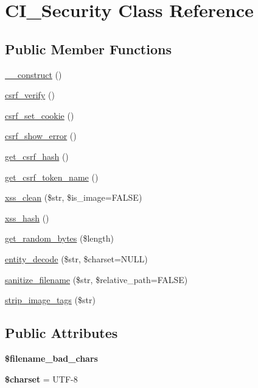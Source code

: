 \hypertarget{class_c_i___security}{}\section{C\+I\+\_\+\+Security Class Reference}
\label{class_c_i___security}
\subsection*{Public Member Functions}
\begin{DoxyCompactItemize}
\item 
\mbox{\hyperlink{class_c_i___security_acd6d23d91f9d1694f2b452174453923a}{\+\_\+\+\_\+construct}} ()
\item 
\mbox{\hyperlink{class_c_i___security_a93ca29fd401c464a867f2a0080d569aa}{csrf\+\_\+verify}} ()
\item 
\mbox{\hyperlink{class_c_i___security_a44fca760f4554dde18ab460c7b730256}{csrf\+\_\+set\+\_\+cookie}} ()
\item 
\mbox{\hyperlink{class_c_i___security_a95912c6a96934b50e3e3f4b5c82a9b84}{csrf\+\_\+show\+\_\+error}} ()
\item 
\mbox{\hyperlink{class_c_i___security_a2477852d563549abd32f4b83b8f30034}{get\+\_\+csrf\+\_\+hash}} ()
\item 
\mbox{\hyperlink{class_c_i___security_a0b40fe053f68a41ed01fca61fc556c37}{get\+\_\+csrf\+\_\+token\+\_\+name}} ()
\item 
\mbox{\hyperlink{class_c_i___security_a2a5bb2a641bd37cbae73a96ee35dee30}{xss\+\_\+clean}} (\$str, \$is\+\_\+image=F\+A\+L\+SE)
\item 
\mbox{\hyperlink{class_c_i___security_ab1eb7d9ec864e80628da033de0ecef22}{xss\+\_\+hash}} ()
\item 
\mbox{\hyperlink{class_c_i___security_ad651614f8414feb0fe424278b95474e5}{get\+\_\+random\+\_\+bytes}} (\$length)
\item 
\mbox{\hyperlink{class_c_i___security_af0bf4f5717d0834d9fecb00e37b78019}{entity\+\_\+decode}} (\$str, \$charset=N\+U\+LL)
\item 
\mbox{\hyperlink{class_c_i___security_a160037793948246cdbea61db427e0d11}{sanitize\+\_\+filename}} (\$str, \$relative\+\_\+path=F\+A\+L\+SE)
\item 
\mbox{\hyperlink{class_c_i___security_a07f39db7ecd3e7a7a3e30e5d3b25158e}{strip\+\_\+image\+\_\+tags}} (\$str)
\end{DoxyCompactItemize}
\subsection*{Public Attributes}
\begin{DoxyCompactItemize}
\item 
{\bfseries \$filename\+\_\+bad\+\_\+chars}
\item 
\mbox{\label{class_c_i___security_a05230a45ad39af17acc7e2d43b84884a}} 
{\bfseries \$charset} = \textquotesingle{}U\+TF-\/8\textquotesingle{}
\end{DoxyCompactItemize}
